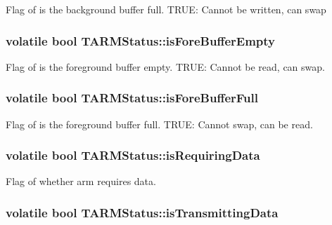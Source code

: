 Flag of is the background buffer full. T\-R\-U\-E\-: Cannot be written, can swap \hypertarget{struct_t_a_r_m_status_a16ee59958b283acaec90b460378bf275}{
\subsubsection[{is\-Fore\-Buffer\-Empty}]{\setlength{\rightskip}{0pt plus 5cm}volatile bool T\-A\-R\-M\-Status\-::is\-Fore\-Buffer\-Empty}}\label{struct_t_a_r_m_status_a16ee59958b283acaec90b460378bf275}
Flag of is the foreground buffer empty. T\-R\-U\-E\-: Cannot be read, can swap. \hypertarget{struct_t_a_r_m_status_abd76e9edbdc18a6fd3a0f7c93f788a60}{
\subsubsection[{is\-Fore\-Buffer\-Full}]{\setlength{\rightskip}{0pt plus 5cm}volatile bool T\-A\-R\-M\-Status\-::is\-Fore\-Buffer\-Full}}\label{struct_t_a_r_m_status_abd76e9edbdc18a6fd3a0f7c93f788a60}
Flag of is the foreground buffer full. T\-R\-U\-E\-: Cannot swap, can be read. \hypertarget{struct_t_a_r_m_status_a8133feec241a9c1d79b1e4cd059c3488}{
\subsubsection[{is\-Requiring\-Data}]{\setlength{\rightskip}{0pt plus 5cm}volatile bool T\-A\-R\-M\-Status\-::is\-Requiring\-Data}}\label{struct_t_a_r_m_status_a8133feec241a9c1d79b1e4cd059c3488}
Flag of whether arm requires data. \hypertarget{struct_t_a_r_m_status_a1d0cf9a59f58ffdea4d579f1596118d7}{
\subsubsection[{is\-Transmitting\-Data}]{\setlength{\rightskip}{0pt plus 5cm}volatile bool T\-A\-R\-M\-Status\-::is\-Transmitting\-Data}}\label{struct_t_a_r_m_status_a1d0cf9a59f58ffdea4d579f1596118d7}
